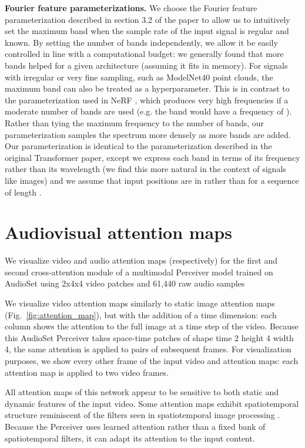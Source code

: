 \documentclass{article}
\begin{document}
\noindent \textbf{Fourier feature parameterizations.} We choose the Fourier feature parameterization described in section 3.2 of the paper to allow us to intuitively set the maximum band when the sample rate of the input signal is regular and known. By setting the number of bands independently, we allow it be easily controlled in line with a computational budget: we generally found that more bands helped for a given architecture (assuming it fits in memory). For signals with irregular or very fine sampling, such as ModelNet40 point clouds, the maximum band can also be treated as a hyperparameter. This is in contrast to the parameterization used in NeRF \cite{mildenhall2020nerf}, which produces very high frequencies if a moderate number of bands are used (e.g. the  band would have a frequency of ). Rather than tying the maximum frequency to the number of bands, our parameterization samples the spectrum more densely as more bands are added. Our parameterization is identical to the parameterization described in the original Transformer paper, except we express each band in terms of its frequency rather than its wavelength (we find this more natural in the context of signals like images) and we assume that input positions are in  rather than  for a sequence of length .




\section{Audiovisual attention maps}
\label{sec:audiovisual_viz}

We visualize video and audio attention maps (respectively) for the first and second cross-attention module of a multimodal Perceiver model trained on AudioSet using 2x4x4 video patches and 61,440 raw audio samples 

We visualize video attention maps similarly to static image attention maps (Fig.~\ref{fig:attention_map}), but with the addition of a time dimension: each column shows the attention to the full image at a time step of the video. Because this AudioSet Perceiver takes space-time patches of shape time 2  height 4  width 4, the same attention is applied to pairs of subsequent frames. For visualization purposes, we show every other frame of the input video and attention maps: each attention map is applied to two video frames.

All attention maps of this network appear to be sensitive to both static and dynamic features of the input video. Some attention maps exhibit spatiotemporal structure reminiscent of the filters seen in spatiotemporal image processing \cite{adelson1985spatiotemporal, simoncelli1998model}. Because the Perceiver uses learned attention rather than a fixed bank of spatiotemporal filters, it can adapt its attention to the input content.
\end{document}
